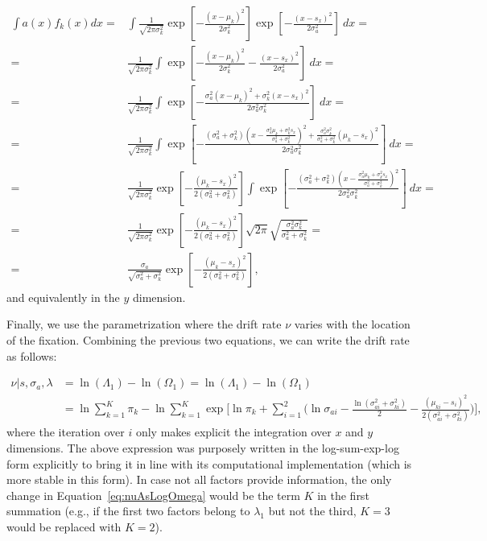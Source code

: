 \documentclass{article}
\begin{document}
\begin{equation}
\begin{aligned}
\int a(x)f_k(x) dx = & \int \frac{1}{\sqrt{2\pi\sigma_k^2}} \exp\left[-\frac{(x-\mu_k)^2}{2\sigma_k^2}\right] \exp\left[-\frac{(x-s_x)^2}{2\sigma_a^2}\right]~dx = \\
= & \frac{1}{\sqrt{2\pi\sigma_k^2}} \int \exp\left[-\frac{(x-\mu_k)^2}{2\sigma_k^2} - \frac{(x-s_x)^2}{2\sigma_a^2}\right]~dx = \\
= & \frac{1}{\sqrt{2\pi\sigma_k^2}} \int \exp\left[-\frac{\sigma_a^2(x-\mu_k)^2 + \sigma_k^2(x-s_x)^2}{2\sigma_a^2\sigma_k^2} \right]~dx = \\
= & \frac{1}{\sqrt{2\pi\sigma_k^2}} \int \exp\left[-\frac{(\sigma_a^2+\sigma_k^2)\left(x-\frac{\sigma_a^2\mu_k + \sigma_k^2s_x}{\sigma_a^2+\sigma_k^2}\right)^2 + \frac{\sigma_a^2\sigma_k^2}{\sigma_a^2 + \sigma_k^2}(\mu_k-s_x)^2}{2\sigma_a^2\sigma_k^2} \right]~dx = \\
= & \frac{1}{\sqrt{2\pi\sigma_k^2}} \exp\left[-\frac{(\mu_k-s_x)^2}{2(\sigma_a^2 + \sigma_k^2)}\right] \int \exp\left[-\frac{(\sigma_a^2+\sigma_k^2)\left(x-\frac{\sigma_a^2\mu_k + \sigma_k^2s_x}{\sigma_a^2+\sigma_k^2}\right)^2}{2\sigma_a^2\sigma_k^2} \right]~dx = \\
= & \frac{1}{\sqrt{2\pi\sigma_k^2}} \exp\left[-\frac{(\mu_k-s_x)^2}{2(\sigma_a^2 + \sigma_k^2)}\right] \sqrt{2\pi} \sqrt{\frac{\sigma_a^2\sigma_k^2}{\sigma_a^2+\sigma_k^2}} = \\
= & \frac{\sigma_a}{\sqrt{\sigma_a^2+\sigma_k^2}} \exp\left[-\frac{(\mu_k-s_x)^2}{2(\sigma_a^2 + \sigma_k^2)}\right],
\end{aligned}
\end{equation}
and equivalently in the $y$ dimension.

Finally, we use the parametrization where the drift rate $\nu$ varies with the location of the fixation. Combining the previous two equations, we can write the drift rate as follows:

\begin{equation}
\label{eq:nuAsLogOmega}
\begin{aligned}
\nu | s, \sigma_a, \lambda & = \ln(\Lambda_1) - \ln(\Omega_1) = \ln(\Lambda_1) - \ln(\Omega_1) \\
& = \ln\sum_{k=1}^K \pi_k- \ln \sum_{k=1}^K \exp \Bigg[\ln \pi_k + \sum_{i=1}^2 \Big( \ln \sigma_{ai} - \frac{\ln (\sigma_{ai}^2+ \sigma_{ki}^2)}{2} - \frac{(\mu_{ki} - s_i)^2}{2(\sigma_{ai}^2 + \sigma_{ki}^2)} \Big)  \Bigg],
\end{aligned}
\end{equation}
where the iteration over $i$ only makes explicit the integration over $x$ and $y$ dimensions. The above expression was purposely written in the log-sum-exp-log form explicitly to bring it in line with its computational implementation (which is more stable in this form). In case not all factors provide information, the only change in Equation~\ref{eq:nuAsLogOmega} would be the term $K$ in the first summation (e.g., if the first two factors belong to $\lambda_1$ but not the third, $K=3$ would be replaced with $K=2$).
\end{document}
